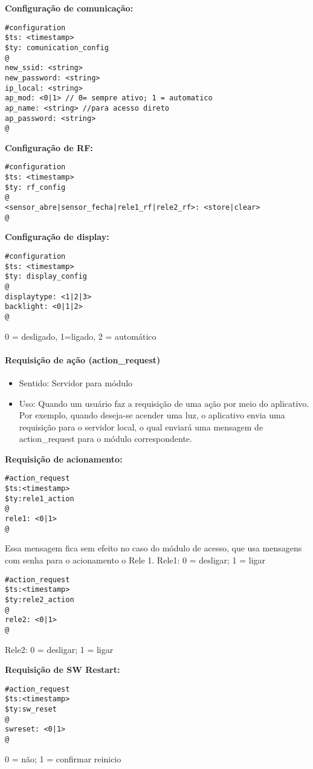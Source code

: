 \textbf{Configuração de comunicação:}
\begin{lstlisting}
#configuration
$ts: <timestamp>
$ty: comunication_config
@
new_ssid: <string>
new_password: <string>
ip_local: <string>
ap_mod: <0|1> // 0= sempre ativo; 1 = automatico
ap_name: <string> //para acesso direto
ap_password: <string>
@
\end{lstlisting}

\textbf{Configuração de RF:}
\begin{lstlisting}
#configuration
$ts: <timestamp>
$ty: rf_config
@
<sensor_abre|sensor_fecha|rele1_rf|rele2_rf>: <store|clear>
@
\end{lstlisting}

\textbf{Configuração de display:}
\begin{lstlisting}
#configuration
$ts: <timestamp>
$ty: display_config
@
displaytype: <1|2|3>
backlight: <0|1|2>
@
\end{lstlisting}
0 = desligado, 1=ligado, 2 = automático

\paragraph{Requisição de ação (action\_request)}
\begin{itemize}
\item Sentido: Servidor para módulo
\item Uso: Quando um usuário faz a requisição de uma ação por meio do aplicativo. Por exemplo, quando deseja-se acender uma luz, o aplicativo envia uma requisição para o servidor local, o qual enviará uma mensagem de action\_request para o módulo correspondente.
\end{itemize}

\textbf{Requisição de acionamento:}
\begin{lstlisting}
#action_request
$ts:<timestamp>
$ty:rele1_action 
@
rele1: <0|1>
@
\end{lstlisting}
Essa mensagem fica sem efeito no caso do módulo de acesso, que usa mensagens com senha para o acionamento o Rele 1.
Rele1: 0 = desligar; 1 = ligar

\begin{lstlisting}
#action_request
$ts:<timestamp>
$ty:rele2_action
@
rele2: <0|1>
@
\end{lstlisting}
Rele2: 0 = desligar; 1 = ligar

\textbf{Requisição de SW Restart:}
\begin{lstlisting}
#action_request
$ts:<timestamp>
$ty:sw_reset
@
swreset: <0|1>
@
\end{lstlisting}
0 = não; 1 = confirmar reinicio

